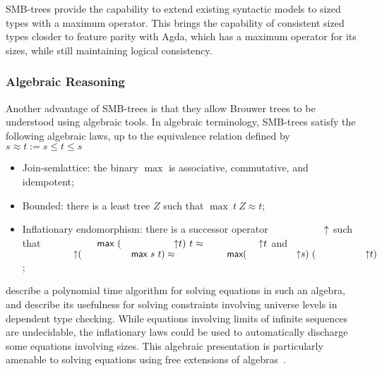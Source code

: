 SMB-trees provide the capability to extend existing syntactic models to sized types
with a maximum operator.
This brings the capability of consistent sized types closder to feature parity with Agda,
which has a maximum operator for its sizes,
while still maintaining logical consistency.

\subsubsection{Algebraic Reasoning}
Another advantage of SMB-trees is that they allow Brouwer trees to
be understood using algebraic tools.
In algebraic terminology, SMB-trees satisfy the following algebraic laws, up to the equivalence relation defined by $s \approx t := s \le t \le s $
\begin{itemize}
  \item Join-semlattice: the binary $\max$ is associative, commutative, and idempotent;
  \item Bounded: there is a least tree $Z$ such that $\max\ t\ Z \approx t$;
  \item Inflationary endomorphism: there is a successor operator $\up$
        such that ${\max\ (\up t)\ t \approx \up t}$
        and\\ ${\up (\max\ s\ t) \approx \max (\up s)\ (\up t)}$;
\end{itemize}

 describe a polynomial time algorithm for solving equations in such an algebra,
and describe its usefulness for solving constraints involving universe levels
in dependent type checking. While equations involving limits of infinite sequences
are undecidable, the inflationary laws could be used to automatically discharge some equations involving sizes. This algebraic presentation is particularly
amenable to solving equations using free extensions of algebras~\citep{corbyn:proof-synthesis,allais2023frex}.


